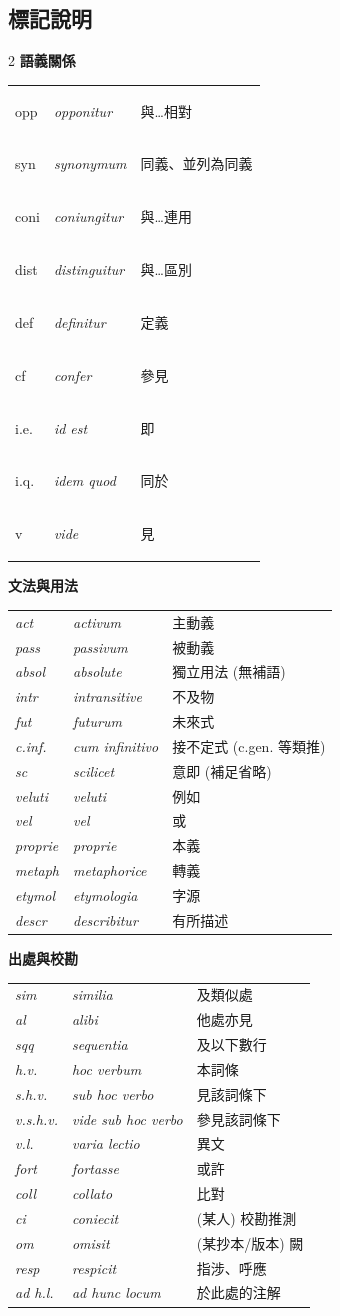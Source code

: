 \documentclass[10.5pt]{article}
\newcommand{\rel}[1]{{\setlength{\fboxsep}{1.2pt}%
  \colorbox{relbg}{\sffamily\footnotesize\color{relc}\strut #1}}}
\newcommand{\mtag}[1]{{\sffamily\itshape\small\color{tagc}#1}}
\begin{document}
\begin{tcolorbox}[enhanced, colback=white, colframe=rulec, sharp corners, boxrule=0.4pt]
\medskip
\subsection*{\sffamily\normalsize 標記說明}
\renewcommand{\arraystretch}{1.2}
\newcommand{\tagrow}[3]{#1 & {\sffamily\itshape\color{latc}#2} & #3\\}
\begin{multicols}{2}\raggedcolumns
\textbf{\sffamily 語義關係}\par\smallskip
\begin{tabular}{@{}l l l@{}}
\tagrow{\rel{opp}}{opponitur}{與…相對}
\tagrow{\rel{syn}}{synonymum}{同義、並列為同義}
\tagrow{\rel{coni}}{coniungitur}{與…連用}
\tagrow{\rel{dist}}{distinguitur}{與…區別}
\tagrow{\rel{def}}{definitur}{定義}
\tagrow{\rel{cf}}{confer}{參見}
\tagrow{\rel{i.e.}}{id est}{即}
\tagrow{\rel{i.q.}}{idem quod}{同於}
\tagrow{\rel{v}}{vide}{見}
\end{tabular}

\medskip
\textbf{\sffamily 文法與用法}\par\smallskip
\begin{tabular}{@{}l l l@{}}
\tagrow{\mtag{act}}{activum}{主動義}
\tagrow{\mtag{pass}}{passivum}{被動義}
\tagrow{\mtag{absol}}{absolute}{獨立用法 (無補語)}
\tagrow{\mtag{intr}}{intransitive}{不及物}
\tagrow{\mtag{fut}}{futurum}{未來式}
\tagrow{\mtag{c.inf.}}{cum infinitivo}{接不定式 (c.gen. 等類推)}
\tagrow{\mtag{sc}}{scilicet}{意即 (補足省略)}
\tagrow{\mtag{veluti}}{veluti}{例如}
\tagrow{\mtag{vel}}{vel}{或}
\tagrow{\mtag{proprie}}{proprie}{本義}
\tagrow{\mtag{metaph}}{metaphorice}{轉義}
\tagrow{\mtag{etymol}}{etymologia}{字源}
\tagrow{\mtag{descr}}{describitur}{有所描述}
\end{tabular}

\columnbreak
\textbf{\sffamily 出處與校勘}\par\smallskip
\begin{tabular}{@{}l l l@{}}
\tagrow{\mtag{sim}}{similia}{及類似處}
\tagrow{\mtag{al}}{alibi}{他處亦見}
\tagrow{\mtag{sqq}}{sequentia}{及以下數行}
\tagrow{\mtag{h.v.}}{hoc verbum}{本詞條}
\tagrow{\mtag{s.h.v.}}{sub hoc verbo}{見該詞條下}
\tagrow{\mtag{v.s.h.v.}}{vide sub hoc verbo}{參見該詞條下}
\tagrow{\mtag{v.l.}}{varia lectio}{異文}
\tagrow{\mtag{fort}}{fortasse}{或許}
\tagrow{\mtag{coll}}{collato}{比對}
\tagrow{\mtag{ci}}{coniecit}{(某人) 校勘推測}
\tagrow{\mtag{om}}{omisit}{(某抄本/版本) 闕}
\tagrow{\mtag{resp}}{respicit}{指涉、呼應}
\tagrow{\mtag{ad h.l.}}{ad hunc locum}{於此處的注解}
\end{tabular}


\end{multicols}
\end{tcolorbox}
\end{document}
